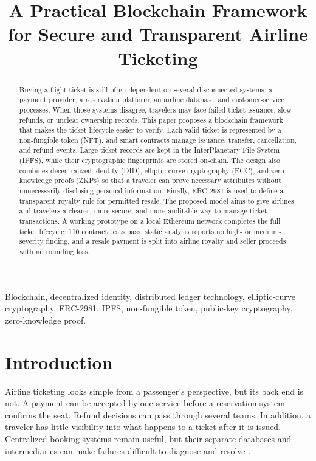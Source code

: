 \documentclass[conference]{IEEEtran}
\begin{document}
\title{A Practical Blockchain Framework for Secure and Transparent Airline Ticketing}

\author{
}

\maketitle

\begin{abstract}
Buying a flight ticket is still often dependent on several disconnected systems: a payment provider, a reservation platform, an airline database, and customer-service processes. When those systems disagree, travelers may face failed ticket issuance, slow refunds, or unclear ownership records. This paper proposes a blockchain framework that makes the ticket lifecycle easier to verify. Each valid ticket is represented by a non-fungible token (NFT), and smart contracts manage issuance, transfer, cancellation, and refund events. Large ticket records are kept in the InterPlanetary File System (IPFS), while their cryptographic fingerprints are stored on-chain. The design also combines decentralized identity (DID), elliptic-curve cryptography (ECC), and zero-knowledge proofs (ZKPs) so that a traveler can prove necessary attributes without unnecessarily disclosing personal information. Finally, ERC-2981 is used to define a transparent royalty rule for permitted resale. The proposed model aims to give airlines and travelers a clearer, more secure, and more auditable way to manage ticket transactions. A working prototype on a local Ethereum network completes the full ticket lifecycle: 110 contract tests pass, static analysis reports no high- or medium-severity finding, and a resale payment is split into airline royalty and seller proceeds with no rounding loss.
\end{abstract}

\begin{IEEEkeywords}
Blockchain, decentralized identity, distributed ledger technology, elliptic-curve cryptography, ERC-2981, IPFS, non-fungible token, public-key cryptography, zero-knowledge proof.
\end{IEEEkeywords}

\section{Introduction}
Airline ticketing looks simple from a passenger's perspective, but its back end is not. A payment can be accepted by one service before a reservation system confirms the seat. Refund decisions can pass through several teams. In addition, a traveler has little visibility into what happens to a ticket after it is issued. Centralized booking systems remain useful, but their separate databases and intermediaries can make failures difficult to diagnose and resolve \cite{shaikh2023}.
\end{document}

